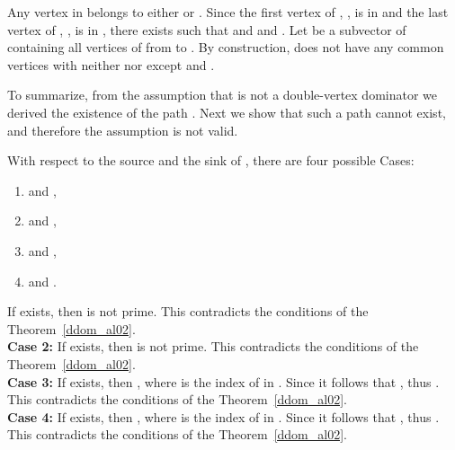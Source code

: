 \documentclass{llncs}
\begin{document}
Any vertex in  belongs to either  or . Since
the first vertex of , , is in  and the last vertex of ,
, is in , there exists  such
that  and  and .
Let  be a subvector of  containing all vertices of   from  to . 
By construction,  does
not have any common vertices with neither  nor  except  and .

To summarize, from the assumption that  is not a
double-vertex dominator  we derived the existence of the path
. Next we show that such a path  cannot exist,
and therefore the assumption is not valid.

With respect to the source and the sink of , there are four possible Cases:
\begin{enumerate}
\item  and ,
\item  and ,
\item  and ,
\item  and .
\end{enumerate}

If  exists, then  is not prime. This
contradicts the conditions of the Theorem~\ref{ddom_al02}.\\
{\bf Case 2:}
If  exists, then  is not prime. This contradicts
the conditions of the Theorem~\ref{ddom_al02}.\\
{\bf Case 3:}
If  exists, then , where  is the index of
 in . Since  it
follows that , thus . This contradicts the
conditions of the Theorem~\ref{ddom_al02}.\\
{\bf Case 4:}
If  exists, then , where  is the index of
 in . Since  it follows that , thus . This
contradicts the conditions of the Theorem~\ref{ddom_al02}.
\begin{flushright}
 \\
\end{flushright}
\end{document}
